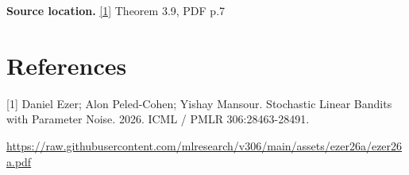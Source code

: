 \documentclass[10pt,a4paper]{article}
\begin{document}
\textbf{Source location.} \href{https://raw.githubusercontent.com/mlresearch/v306/main/assets/ezer26a/ezer26a.pdf}{[1]} Theorem 3.9, PDF p.7

\section{References}
[1] Daniel Ezer; Alon Peled-Cohen; Yishay Mansour. Stochastic Linear Bandits with Parameter Noise. 2026. ICML / PMLR 306:28463-28491.

\url{https://raw.githubusercontent.com/mlresearch/v306/main/assets/ezer26a/ezer26a.pdf}
\end{document}
